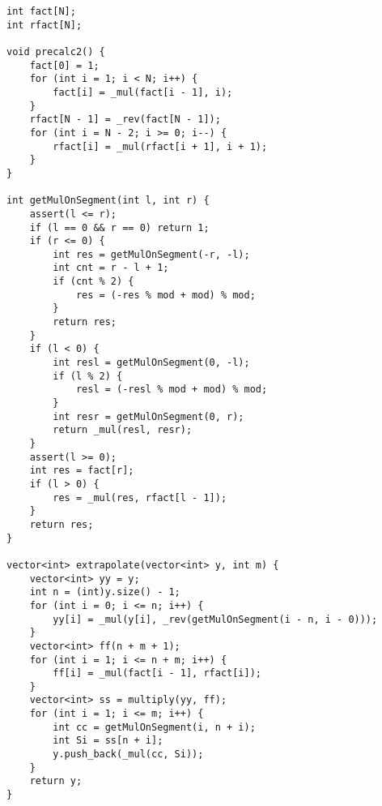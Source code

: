 \documentclass[12pt]{article}
\begin{document}
\begin{verbatim}
int fact[N];
int rfact[N];

void precalc2() {
    fact[0] = 1;
    for (int i = 1; i < N; i++) {
        fact[i] = _mul(fact[i - 1], i);
    }
    rfact[N - 1] = _rev(fact[N - 1]);
    for (int i = N - 2; i >= 0; i--) {
        rfact[i] = _mul(rfact[i + 1], i + 1);
    }
}

int getMulOnSegment(int l, int r) {
    assert(l <= r);
    if (l == 0 && r == 0) return 1;
    if (r <= 0) {
        int res = getMulOnSegment(-r, -l);
        int cnt = r - l + 1;
        if (cnt % 2) {
            res = (-res % mod + mod) % mod;
        }
        return res;
    }
    if (l < 0) {
        int resl = getMulOnSegment(0, -l);
        if (l % 2) {
            resl = (-resl % mod + mod) % mod;
        }
        int resr = getMulOnSegment(0, r);
        return _mul(resl, resr);
    }
    assert(l >= 0);
    int res = fact[r];
    if (l > 0) {
        res = _mul(res, rfact[l - 1]);
    }
    return res;
}

vector<int> extrapolate(vector<int> y, int m) {
    vector<int> yy = y;
    int n = (int)y.size() - 1;
    for (int i = 0; i <= n; i++) {
        yy[i] = _mul(y[i], _rev(getMulOnSegment(i - n, i - 0)));
    }
    vector<int> ff(n + m + 1);
    for (int i = 1; i <= n + m; i++) {
        ff[i] = _mul(fact[i - 1], rfact[i]);
    }
    vector<int> ss = multiply(yy, ff);
    for (int i = 1; i <= m; i++) {
        int cc = getMulOnSegment(i, n + i);
        int Si = ss[n + i];
        y.push_back(_mul(cc, Si));
    }
    return y;
}

\end{verbatim}

\end{document}

